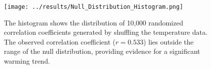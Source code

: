 \documentclass[12pt]{article}
\begin{document}
\begin{figure}[!htbp]
    \centering
    \texttt{[image: ../results/Null\_Distribution\_Histogram.png]}
    \caption{The histogram shows the distribution of 10,000 randomized correlation coefficients generated by shuffling the temperature data. The observed correlation coefficient ($r=0.533$) lies outside the range of the null distribution, providing evidence for a significant warming trend.}
    \label{fig:histogram}
\end{figure}
\end{document}
